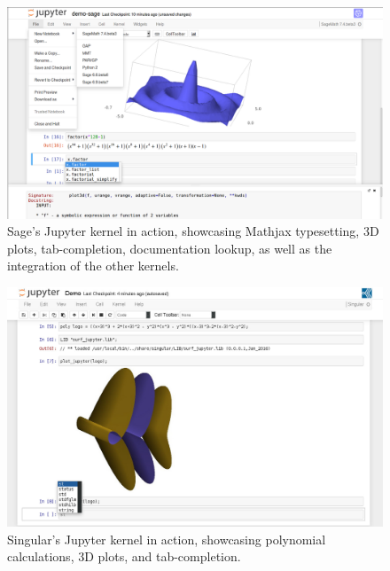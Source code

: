 \documentclass{deliverablereport}
\begin{document}
\begin{figure}
  \includegraphics[height=.4\textheight]{screenshot-sage.png}
  \caption{Sage's Jupyter kernel in action, showcasing Mathjax
    typesetting, 3D plots, tab-completion, documentation lookup, as
    well as the integration of the other kernels.}
\end{figure}
\begin{figure}
  \includegraphics[height=.4\textheight]{screenshot-singular.png}
  \caption{Singular's Jupyter kernel in action, showcasing polynomial
    calculations, 3D plots, and tab-completion.}
\end{figure}
\clearpage
\end{document}
